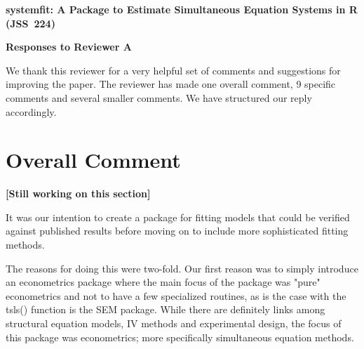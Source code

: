 \documentclass[12pt,english]{scrartcl}
\begin{document}
\begin{center}
{\Large\textbf{
systemfit: A Package to Estimate
Simultaneous Equation Systems in R (JSS~224)}}

\bigskip

{\Large\textbf{Responses to Reviewer A}}
\end{center}


We thank this reviewer for a very helpful set of comments and suggestions
for improving the paper.
The reviewer has made one overall comment, 9 specific comments and
several smaller comments.
We have structured our reply accordingly.

\section{Overall Comment}

\textbf{[Still working on this section]}

It was our intention to create a package for fitting models that could
be verified against published results before moving on to include more
sophisticated fitting methods. 

The reasons for doing this were two-fold.  Our first reason was to
simply introduce an econometrics package where the main focus of the
package was "pure" econometrics and not to have a few specialized
routines, as is the case with the tsls() function is the SEM
package. While there are definitely links among structural equation
models, IV methods and experimental design, the focus of this package
was econometrics; more specifically simultaneous equation methods.   
\end{document}
